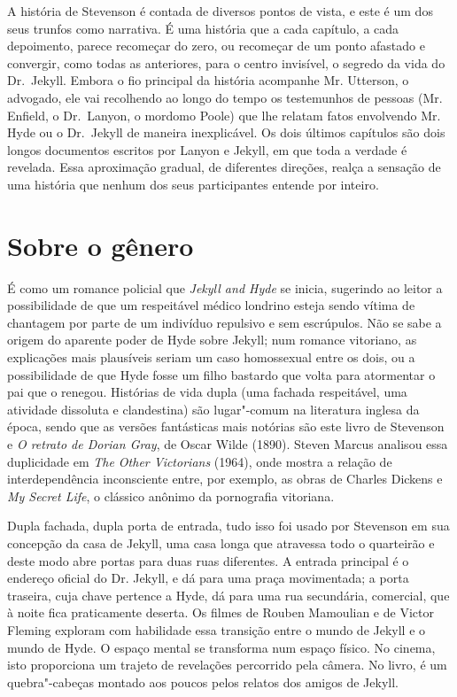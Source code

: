 A história de Stevenson é contada de diversos pontos de vista, e este é
um dos seus trunfos como narrativa.  É uma história que a cada
capítulo, a cada depoimento, parece recomeçar do zero, ou recomeçar de
um ponto afastado e convergir, como todas as anteriores, para o centro
invisível, o segredo da vida do Dr.~Jekyll.  Embora o fio principal da
história acompanhe Mr. Utterson, o advogado, ele vai recolhendo ao
longo do tempo os testemunhos de pessoas (Mr. Enfield, o Dr.~Lanyon, o
mordomo Poole) que lhe relatam fatos envolvendo Mr. Hyde ou o Dr.~Jekyll 
de maneira inexplicável. Os dois últimos capítulos são dois
longos documentos escritos por Lanyon e Jekyll, em que toda a verdade é
revelada.  Essa aproximação gradual, de diferentes direções, realça a
sensação de uma história que nenhum dos seus participantes entende por
inteiro.  



\section{Sobre o gênero}
É como um romance policial que \textit{Jekyll and Hyde} se inicia,
sugerindo ao leitor a possibilidade de que um respeitável médico
londrino esteja sendo vítima de chantagem por parte de um indivíduo
repulsivo e sem escrúpulos.  Não se sabe a origem do aparente poder de
Hyde sobre Jekyll; num romance vitoriano, as explicações mais
plausíveis seriam um caso homossexual entre os dois, ou a possibilidade
de que Hyde fosse um filho bastardo que volta para atormentar o pai que
o renegou.  Histórias de vida dupla (uma fachada respeitável, uma
atividade dissoluta e clandestina) são lugar"-comum na literatura
inglesa da época, sendo que as versões fantásticas mais notórias são
este livro de Stevenson e \textit{O retrato de Dorian
Gray}, de Oscar Wilde (1890).  Steven Marcus analisou essa duplicidade
em \textit{The Other Victorians} (1964), onde mostra a relação de
interdependência inconsciente entre, por exemplo, as obras de Charles
Dickens e \textit{My Secret Life}, o clássico anônimo da pornografia
vitoriana. 

Dupla fachada, dupla porta de entrada, tudo isso foi usado por Stevenson
em sua concepção da casa de Jekyll, uma casa longa que atravessa todo o
quarteirão e deste modo abre portas para duas ruas diferentes.  A
entrada principal é o endereço oficial do Dr. Jekyll, e dá para uma
praça movimentada; a porta traseira, cuja chave pertence a Hyde, dá
para uma rua secundária, comercial, que à noite fica praticamente
deserta.  Os filmes de Rouben Mamoulian e de Victor Fleming exploram
com habilidade essa transição entre o mundo de Jekyll e o mundo de
Hyde.  O espaço mental se transforma num espaço físico. No cinema, isto
proporciona um trajeto de revelações percorrido pela câmera. No livro,
é um quebra"-cabeças montado aos poucos pelos relatos dos amigos de
Jekyll. 



